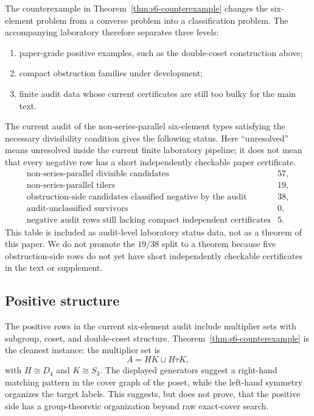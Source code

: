 The counterexample in Theorem~\ref{thm:s6-counterexample} changes the
six-element problem from a converse problem into a classification problem.
The accompanying laboratory therefore separates three levels:

\begin{enumerate}
\item paper-grade positive examples, such as the double-coset construction
      above;
\item compact obstruction families under development;
\item finite audit data whose current certificates are still too bulky for
      the main text.
\end{enumerate}

The current audit of the non-series-parallel six-element types satisfying
the necessary divisibility condition gives the following status.  Here
``unresolved'' means unresolved inside the current finite laboratory
pipeline; it does not mean that every negative row has a short
independently checkable paper certificate.
\[
\begin{array}{lr}
\text{non-series-parallel divisible candidates} & 57,\\
\text{non-series-parallel tilers} & 19,\\
\text{obstruction-side candidates classified negative by the audit} & 38,\\
\text{audit-unclassified survivors} & 0,\\
\text{negative audit rows still lacking compact independent certificates} & 5.
\end{array}
\]
This table is included as audit-level laboratory status data, not as a
theorem of this paper.  We do not promote the $19/38$ split to a theorem
because five obstruction-side rows do not yet have short independently
checkable certificates in the text or supplement.

\subsection*{Positive structure}

The positive rows in the current six-element audit include multiplier sets
with subgroup, coset, and double-coset structure.
Theorem~\ref{thm:s6-counterexample} is the cleanest instance:
the multiplier set is
\[
        A=HK\sqcup H\tau K,
\]
with $H\cong D_4$ and $K\cong S_3$.  The displayed generators suggest a
right-hand matching pattern in the cover graph of the poset, while the
left-hand symmetry organizes the target labels.
This suggests, but does not prove, that the positive side has a
group-theoretic organization beyond raw exact-cover search.

